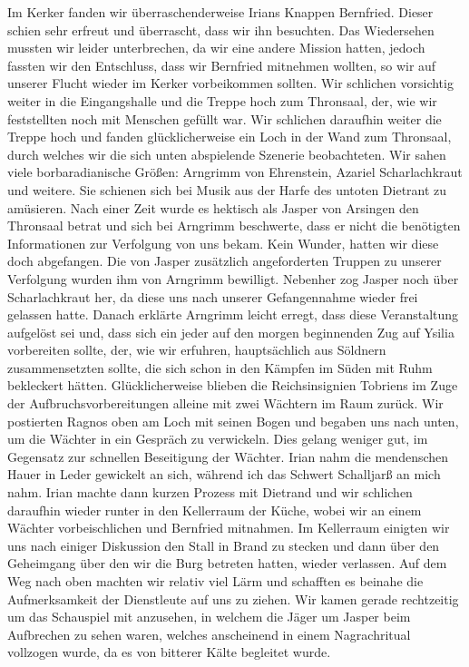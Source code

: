Im Kerker fanden wir überraschenderweise Irians Knappen Bernfried. Dieser schien sehr erfreut und überrascht, dass wir ihn besuchten. Das Wiedersehen mussten wir leider unterbrechen, da wir eine andere Mission hatten, jedoch fassten wir den Entschluss, dass wir Bernfried mitnehmen wollten, so wir auf unserer Flucht wieder im Kerker vorbeikommen sollten. Wir schlichen vorsichtig weiter in die Eingangshalle und die Treppe hoch zum Thronsaal, der, wie wir feststellten noch mit Menschen gefüllt war. Wir schlichen daraufhin weiter die Treppe hoch und fanden glücklicherweise ein Loch in der Wand zum Thronsaal, durch welches wir die sich unten abspielende Szenerie beobachteten. Wir sahen viele borbaradianische Größen: Arngrimm von Ehrenstein, Azariel Scharlachkraut und weitere. Sie schienen sich bei Musik aus der Harfe des untoten Dietrant zu amüsieren. Nach einer Zeit wurde es hektisch als Jasper von Arsingen den Thronsaal betrat und sich bei Arngrimm beschwerte, dass er nicht die benötigten Informationen zur Verfolgung von uns bekam. Kein Wunder, hatten wir diese doch abgefangen. Die von Jasper zusätzlich angeforderten Truppen zu unserer Verfolgung wurden ihm von Arngrimm bewilligt. Nebenher zog Jasper noch über Scharlachkraut her, da diese uns nach unserer Gefangennahme wieder frei gelassen hatte. Danach erklärte Arngrimm leicht erregt, dass diese Veranstaltung aufgelöst sei und, dass sich ein jeder auf den morgen beginnenden Zug auf Ysilia vorbereiten sollte, der, wie wir erfuhren, hauptsächlich aus Söldnern zusammensetzten sollte, die sich schon in den Kämpfen im Süden mit Ruhm bekleckert hätten. Glücklicherweise blieben die Reichsinsignien Tobriens im Zuge der Aufbruchsvorbereitungen alleine mit zwei Wächtern im Raum zurück. Wir postierten Ragnos oben am Loch mit seinen Bogen und begaben uns nach unten, um die Wächter in ein Gespräch zu verwickeln. Dies gelang weniger gut, im Gegensatz zur schnellen Beseitigung der Wächter. Irian nahm die mendenschen Hauer in Leder gewickelt an sich, während ich das Schwert Schalljarß an mich nahm. Irian machte dann kurzen Prozess mit Dietrand und wir schlichen daraufhin wieder runter in den Kellerraum der Küche, wobei wir an einem Wächter vorbeischlichen und Bernfried mitnahmen. Im Kellerraum einigten wir uns nach einiger Diskussion den Stall in Brand zu stecken und dann über den Geheimgang über den wir die Burg betreten hatten, wieder verlassen. Auf dem Weg nach oben machten wir relativ viel Lärm und schafften es beinahe die Aufmerksamkeit der Dienstleute auf uns zu ziehen. Wir kamen gerade rechtzeitig um das Schauspiel mit anzusehen, in welchem die Jäger um Jasper beim Aufbrechen zu sehen waren, welches anscheinend in einem Nagrachritual vollzogen wurde, da es von bitterer Kälte begleitet wurde.

